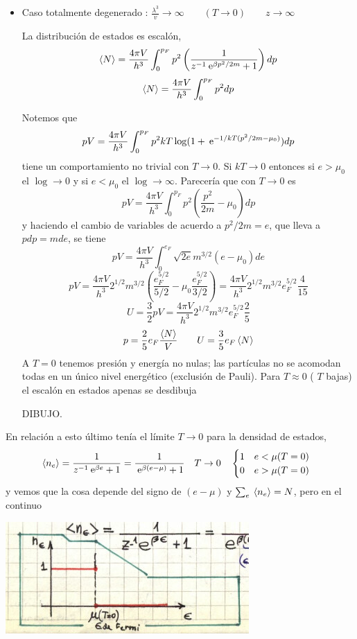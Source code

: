 \documentclass[10pt,oneside]{CBFT_book}
\begin{document}
\begin{itemize}
 \item Caso totalmente degenerado : $\frac{\lambda^3}{v} \to \infty \qquad (T \to 0) \qquad z \to \infty $
 
 La distribución de estados es escalón,
 \[
	\braket{N} = \frac{ 4 \pi V }{ h^3 } \int_0^{p_F} p^2 \left( \frac{  1  }{  z^{-1} \:\mathrm{e}^{\beta p^2 / 2m } + 1 } \right) dp
 \]
 \[
	\braket{N} = \frac{ 4 \pi V }{ h^3 } \int_0^{p_F} p^2 dp
 \]
 
 Notemos que 
 \[
	pV = \frac{ 4 \pi V }{ h^3 } \int_0^{p_F} p^2 kT \log (1 + \:\mathrm{e}^{ -1/kT( p^2/2m - \mu_0 )} ) dp
 \]
 tiene un comportamiento no trivial con $ T \to 0 $. Si $ kT \to 0 $ entonces si $e > \mu_0$ el $\log \to 0$
 y si $e < \mu_0$ el $\log \to \infty $.
 Parecería que con $ T \to 0 $ es
 \[
 	pV = \frac{ 4 \pi V }{ h^3 } \int_0^{p_F} p^2 \left( \frac{ p^2 }{ 2m } - \mu_0 \right) dp
 \]
 y haciendo el cambio de variables de acuerdo a $ p^2 / 2m = e $, que lleva a $ pdp = m de $, se tiene 
 \[
 	pV = \frac{ 4 \pi V }{ h^3 } \int_0^{e_F} \sqrt{2e} m^{3/2} ( e -\mu_0 ) de
 \]
 \[
	pV = \frac{ 4 \pi V }{ h^3 } 2^{ 1/2 } m^{ 3/2 } 
	\left( \frac{e_F^{ 5/2 }}{5/2} - \mu_0 \frac{e_F^{ 5/2 }}{3/2} \right) =
	\frac{ 4 \pi V }{ h^3 }2^{ 1/2 } m^{ 3/2 } e_F^{ 5/2 } \frac{ 4 }{ 15 }
 \]
 \[
	U = \frac{3}{2} p V = \frac{ 4 \pi V }{ h^3 }2^{ 1/2 } m^{ 3/2 } e_F^{ 5/2 } \frac{ 2 }{ 5 }
 \]
 \[
	p = \frac{2}{5} e_F \frac{\braket{N}}{V} \qquad U = \frac{3}{5} e_F \braket{N} 
 \]
 A $ T = 0 $ tenemos presión y energía no nulas; las partículas no se acomodan todas en un único nivel energético
 (exclusión de Pauli).
 Para $ T \approx 0 $ ( $T$ bajas) el escalón en estados apenas se desdibuja
 
 DIBUJO.
 
\end{itemize}

En relación a esto último tenía el límite $ T \to 0 $ para la densidad de estados,
\[
	\:\left\langle n_e \right\rangle = \frac{ 1 }{ z^{-1}\:\mathrm{e}^{\beta e} + 1 } = 
	\frac{ 1 }{ \:\mathrm{e}^{\beta (e-\mu)} + 1 } \quad T \to 0 \quad 
	\begin{cases}
		1 \quad e < \mu (T=0) \\
		0 \quad e > \mu (T=0) 
	\end{cases}
\]
y vemos que la cosa depende del signo de $(e - \mu)$ y  $ \sum_e \:\left\langle n_e \right\rangle = N $, pero
en el continuo

\includegraphics[scale=0.5]{images/1606329575.jpg}
\end{document}
